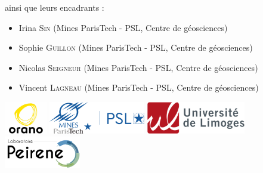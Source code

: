 \documentclass{article}
\begin{document}
ainsi que leurs encadrants :

\begin{itemize}
    \item Irina \textsc{Sin} (Mines ParisTech - PSL, Centre de géosciences) 
    \item Sophie \textsc{Guillon} (Mines ParisTech - PSL, Centre de géosciences) 
    \item Nicolas \textsc{Seigneur} (Mines ParisTech - PSL, Centre de géosciences) 
    \item Vincent \textsc{Lagneau} (Mines ParisTech - PSL, Centre de géosciences) 
\end{itemize}


\vspace{0.5 em}
\begin{center}
\includegraphics[height = 40pt]{oranologo.png}
\hspace{0.3em}
\includegraphics[height = 40pt ]{logoMPT.png}
\hspace{0.3em}
\includegraphics[height = 40pt ]{logoUNILIM.png}
\hspace{0.3em}
\includegraphics[height = 40pt ]{Logo-PEIRENE.png}


\end{center}
\end{document}
